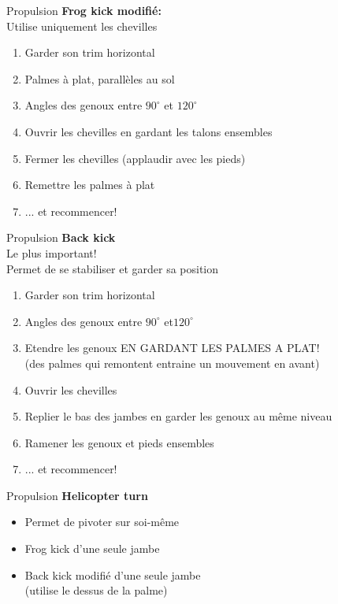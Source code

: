\begin{frame}{Propulsion}  
	\textbf{Frog kick modifié:}\\
	Utilise uniquement les chevilles

	\begin{enumerate}	
		\item Garder son trim horizontal
		\item Palmes à plat, parallèles au sol
		\item Angles des genoux entre $90^{\circ}$ et $120^{\circ}$
		\item Ouvrir les chevilles en gardant les talons ensembles
		\item Fermer les chevilles (applaudir avec les pieds)
		\item Remettre les palmes à plat
		\item ... et recommencer!
	\end{enumerate}
\end{frame}

\begin{frame}{Propulsion}  
	\textbf{Back kick}\\
	Le plus important!\\
	Permet de se stabiliser et garder sa position

	\begin{enumerate}
		\item Garder son trim horizontal
		\item Angles des genoux entre $90^{\circ}$ et$120^{\circ}$
		\item Etendre les genoux EN GARDANT LES PALMES A PLAT! \\
				(des palmes qui remontent entraine un mouvement en avant)
		\item Ouvrir les chevilles
		\item Replier le bas des jambes en garder les genoux au même niveau
		\item Ramener les genoux et pieds ensembles
		\item ... et recommencer!
	\end{enumerate}
\end{frame}

\begin{frame}{Propulsion}  
	\textbf{Helicopter turn}
	\begin{itemize}
		\item Permet de pivoter sur soi-même
		\item Frog kick d'une seule jambe
		\item Back kick modifié d'une seule jambe\\(utilise le dessus de la palme)
	\end{itemize}
\end{frame}

